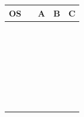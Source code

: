 \documentclass{article}
\begin{document}
\renewcommand\arraystretch{1.7}%
\begin{tabular}{|p{1in}|p{0.2in}|p{1.2in}|p{1.2in}|p{1.2in}|}
\hline
OS      &  & A & B & C \\ \hline
        &  &   &   &   \\ \hline
        &  &   &   &   \\ \hline
        &  &   &   &   \\ \hline
        &  &   &   &   \\ \hline
        &  &   &   &   \\ \hline
        &  &   &   &   \\ \hline
        &  &   &   &   \\ \hline
        &  &   &   &   \\ \hline
        &  &   &   &   \\ \hline
        &  &   &   &   \\ \hline
        &  &   &   &   \\ \hline
        &  &   &   &   \\ \hline
        &  &   &   &   \\ \hline
        &  &   &   &   \\ \hline
        &  &   &   &   \\ \hline
        &  &   &   &   \\ \hline
        &  &   &   &   \\ \hline
        &  &   &   &   \\ \hline
        &  &   &   &   \\ \hline
        &  &   &   &   \\ \hline
        &  &   &   &   \\ \hline
        &  &   &   &   \\ \hline
        &  &   &   &   \\ \hline
        &  &   &   &   \\ \hline
        &  &   &   &   \\ \hline
        &  &   &   &   \\ \hline
        &  &   &   &   \\ \hline
        &  &   &   &   \\ \hline
        &  &   &   &   \\ \hline

\end{tabular}
\newpage
\end{document}
